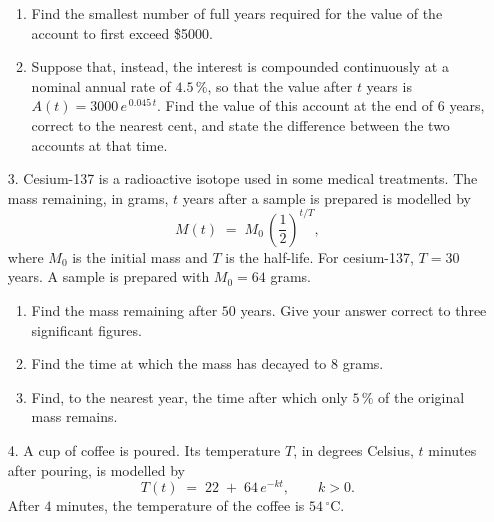 \documentclass[12pt, twoside]{article}
\begin{document}
\begin{enumerate}[itemsep=0.15cm]
\begin{enumerate}[itemsep=0.15cm]
  \item Find the smallest number of full years required for the value
  of the account to first exceed \$5000.

  \item Suppose that, instead, the interest is compounded continuously
  at a nominal annual rate of $4.5\,\%$, so that the value after $t$
  years is $A(t) = 3000\, e^{\,0.045\, t}$. Find the value of this
  account at the end of $6$ years, correct to the nearest cent, and
  state the difference between the two accounts at that time.
\end{enumerate}


\newpage

\item[3.] Cesium-137 is a radioactive isotope used in some medical
treatments. The mass remaining, in grams, $t$ years after a sample is
prepared is modelled by
$$M(t) \;=\; M_{0}\, \!\left(\dfrac{1}{2}\right)^{\!t/T},$$
where $M_{0}$ is the initial mass and $T$ is the half-life. For
cesium-137, $T = 30$ years. A sample is prepared with $M_{0} = 64$
grams.

\begin{enumerate}[itemsep=0.15cm]
  \item Find the mass remaining after $50$ years. Give your answer
  correct to three significant figures.

  \item Find the time at which the mass has decayed to $8$ grams.

  \item Find, to the nearest year, the time after which only $5\,\%$
  of the original mass remains.
\end{enumerate}


\newpage

\item[4.] A cup of coffee is poured. Its temperature $T$, in degrees
Celsius, $t$ minutes after pouring, is modelled by
$$T(t) \;=\; 22 \;+\; 64\, e^{-k t}, \qquad k > 0.$$
After $4$ minutes, the temperature of the coffee is $54\,^{\circ}$C.


\end{enumerate}
\end{document}
